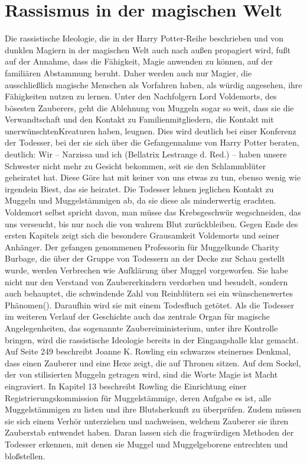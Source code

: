 \section{Rassismus in der magischen Welt}
Die rassistische Ideologie, die in der \glqq Harry Potter\grqq-Reihe beschrieben und von dunklen Magiern in der magischen Welt auch nach außen propagiert wird, fußt auf der Annahme, dass die Fähigkeit, Magie anwenden zu können, auf der familiären Abstammung beruht. Daher werden auch nur Magier, die ausschließlich magische Menschen als Vorfahren haben, als würdig angesehen, ihre Fähigkeiten nutzen zu lernen. Unter den Nachfolgern Lord Voldemorts, des bösesten Zauberers, geht die Ablehnung von Muggeln sogar so weit, dass sie die Verwandtschaft und den Kontakt zu Familienmitgliedern, die Kontakt mit \glqq unerwünschten\grqq Kreaturen haben, leugnen. Dies wird deutlich bei einer Konferenz der Todesser, bei der sie sich über die Gefangennahme von Harry Potter beraten, deutlich: \glqq Wir – Narzissa und ich (Bellatrix Lestrange d. Red.) – haben unsere Schwester nicht mehr zu Gesicht bekommen, seit sie den Schlammblüter geheiratet hat. Diese Göre hat mit keiner von uns etwas zu tun, ebenso wenig wie irgendein Biest, das sie heiratet.\cite[S.18]{JKR10}\grqq{}
Die Todesser lehnen jeglichen Kontakt zu Muggeln und Muggelstämmigen ab, da sie diese als minderwertig erachten. Voldemort selbst spricht davon, man müsse \glqq das Krebsgeschwür wegschneiden, das uns verseucht, bis nur noch die von wahrem Blut zurückbleiben.\cite[S.19]{JKR10}\grqq{} Gegen Ende des ersten Kapitels zeigt sich die besondere Grausamkeit Voldemorts und seiner Anhänger. Der gefangen genommenen Professorin für \glqq Muggelkunde\grqq{} Charity Burbage, die über der Gruppe von Todessern an der Decke zur Schau gestellt wurde, werden \glqq Verbrechen\grqq{} wie Aufklärung über Muggel vorgeworfen. Sie habe nicht nur \glqq den Verstand von Zaubererkindern\grqq{} verdorben und besudelt, sondern auch behauptet, die schwindende Zahl von Reinblütern sei ein \glqq wünschenswertes Phänomen\grqq (\cite[S.19]{JKR10}). Daraufhin wird sie mit einem Todesfluch getötet.
Als die Todesser im weiteren Verlauf der Geschichte auch das zentrale Organ für magische Angelegenheiten, das sogenannte Zaubereiministerium, unter ihre Kontrolle bringen, wird die rassistische Ideologie bereits in der Eingangshalle klar gemacht. Auf Seite 249 beschreibt Joanne K. Rowling ein schwarzes steinernes Denkmal, dass einen Zauberer und eine Hexe zeigt, die auf Thronen sitzen.\cite[S.249]{JKR10} Auf dem Sockel, der von stilisierten Muggeln getragen wird, sind die Worte \glqq Magie ist Macht\grqq{} eingraviert. In Kapitel 13 beschreibt Rowling die Einrichtung einer \glqq Registrierungskommission für Muggelstämmige\grqq , deren Aufgabe es ist, alle Muggelstämmigen zu listen und ihre Blutsherkunft zu überprüfen. Zudem müssen sie sich einem Verhör unterziehen und nachweisen, welchem Zauberer sie ihren Zauberstab entwendet haben\cite [S.268]{JKR10}. Daran lassen sich die fragwürdigen Methoden der Todesser erkennen, mit denen sie Muggel und Muggelgeborene entrechten und bloßstellen. 
